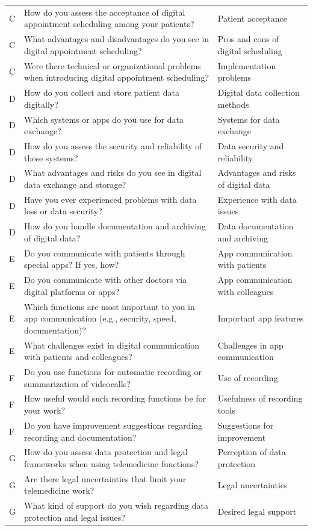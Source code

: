 \begin{longtable}{@{}l>{\RaggedRight\arraybackslash}p{}>{\RaggedRight\arraybackslash}p{}@{}}
C & How do you assess the acceptance of digital appointment scheduling among your patients? & Patient acceptance \\
C & What advantages and disadvantages do you see in digital appointment scheduling? & Pros and cons of digital scheduling \\
C & Were there technical or organizational problems when introducing digital appointment scheduling? & Implementation problems \\
D & How do you collect and store patient data digitally? & Digital data collection methods \\
D & Which systems or apps do you use for data exchange? & Systems for data exchange \\
D & How do you assess the security and reliability of these systems? & Data security and reliability \\
D & What advantages and risks do you see in digital data exchange and storage? & Advantages and risks of digital data \\
D & Have you ever experienced problems with data loss or data security? & Experience with data issues \\
D & How do you handle documentation and archiving of digital data? & Data documentation and archiving \\
E & Do you communicate with patients through special apps? If yes, how? & App communication with patients \\
E & Do you communicate with other doctors via digital platforms or apps? & App communication with colleagues \\
E & Which functions are most important to you in app communication (e.g., security, speed, documentation)? & Important app features \\
E & What challenges exist in digital communication with patients and colleagues? & Challenges in app communication \\
F & Do you use functions for automatic recording or summarization of videocalls? & Use of recording \\
F & How useful would such recording functions be for your work? & Usefulness of recording tools \\
F & Do you have improvement suggestions regarding recording and documentation? & Suggestions for improvement \\
G & How do you assess data protection and legal frameworks when using telemedicine functions? & Perception of data protection \\
G & Are there legal uncertainties that limit your telemedicine work? & Legal uncertainties \\
G & What kind of support do you wish regarding data protection and legal issues? & Desired legal support \\
\end{longtable}

